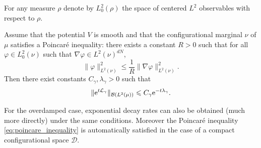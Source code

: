         For any measure $\rho$ denote by $L^2_0(\rho)$ the space of centered $L^2$ observables with respect to $\rho$.
        \begin{prop}
            Assume that the potential $V$ is smooth and that the configurational marginal $\nu$ of $\mu$ satisfies a Poincaré inequality:
            there exists a constant $R>0$ such that for all $\varphi \in L^2_0(\nu)$ such that $\nabla \varphi \in L^2(\nu)^{dN}$,
            \begin{equation}
                \label{eq:poincare_inequality}
                \|\varphi \|_{L^2(\nu)}^2\leq \frac1R \| \nabla \varphi\|^2_{L^2(\nu)}.
            \end{equation}
            Then there exist constants $C_\gamma,\lambda_\gamma >0$ such that 
            \begin{equation}
                \label{eq:semigroup_exp_decay}
                \|\mathrm{e}^{t\mathcal{L}_\gamma}\|_{\mathcal{B}(L^2(\mu))}\leqslant C_\gamma \mathrm{e}^{-t\lambda_\gamma}.
            \end{equation}
        \end{prop}
        For the overdamped case, exponential decay rates can also be obtained (much more directly) under the same conditions.
        Moreover the Poincaré inequality \eqref{eq:poincare_inequality} is automatically satisfied in the case of a compact configurational space $\mathcal D$.
        
